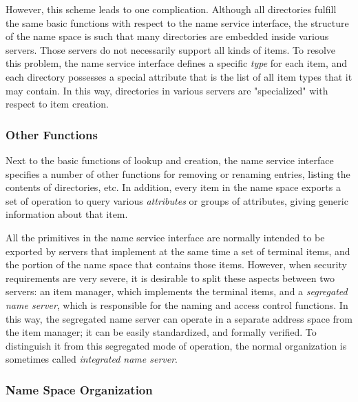 However, this scheme leads to one complication. Although all
directories fulfill the same basic functions with respect to the name
service interface, the structure of the name space is such that many
directories are embedded inside various servers. Those servers do not
necessarily support all kinds of items. To resolve this problem, the
name service interface defines a specific {\em type} for each item, and
each directory possesses a special attribute that is the list of all
item types that it may contain. In this way, directories in various
servers are "specialized" with respect to item creation. 


\subsubsection{Other Functions}

Next to the basic functions of lookup and creation, the name service
interface specifies a number of other functions for removing or
renaming entries, listing the contents of directories, etc.  In
addition, every item in the name space exports a set of operation to
query various {\em attributes} or groups of attributes, giving generic
information about that item.

All the primitives in the name service interface are normally intended
to be exported by servers that implement at the same time a set of
terminal items, and the portion of the name space that contains those
items. However, when security requirements are very severe, it is
desirable to split these aspects between two servers: an item manager,
which implements the terminal items, and a {\em segregated name
server}, which is responsible for the naming and access control
functions. In this way, the segregated name server can operate in a
separate address space from the item manager; it can be easily
standardized, and formally verified.  To distinguish it
from this segregated mode of operation, the normal organization is
sometimes called {\em integrated name server}.


\subsubsection{Name Space Organization}

